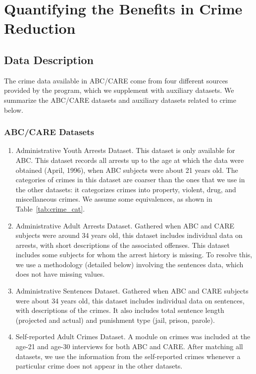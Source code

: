\section{Quantifying the Benefits in Crime Reduction} \label{appendix:crime}

\subsection{Data Description}

\noindent The crime data available in ABC/CARE come from four different sources provided by the program, which we supplement with auxiliary datasets. We summarize the ABC/CARE datasets and auxiliary datasets related to crime below. \\

\subsubsection{ABC/CARE Datasets}
\begin{enumerate}
\item Administrative Youth Arrests Dataset.  This dataset is only available for ABC. This dataset records all arrests up to the age at which the data were obtained (April, 1996), when ABC subjects were about 21 years old. The categories of crimes in this dataset are coarser than the ones that we use in the other datasets: it categorizes crimes into property, violent, drug, and miscellaneous crimes. We assume some equivalences, as shown in Table~\ref{tab:crime_cat}.
\item Administrative Adult Arrests Dataset. Gathered when ABC and CARE subjects were around 34 years old, this dataset includes individual data on arrests, with short descriptions of the associated offenses. This dataset includes some subjects for whom the arrest history is missing. To resolve this, we use a methodology (detailed below) involving the sentences data, which does not have missing values.
\item Administrative Sentences Dataset. Gathered when ABC and CARE subjects were about 34 years old, this dataset includes individual data on sentences, with descriptions of the crimes. It also includes total sentence length (projected and actual) and punishment type (jail, prison, parole).
\item Self-reported Adult Crimes Dataset. A module on crimes was included at the age-21 and age-30 interviews for both ABC and CARE. After matching all datasets, we use the information from the self-reported crimes whenever a particular crime does not appear in the other datasets.
\end{enumerate}

